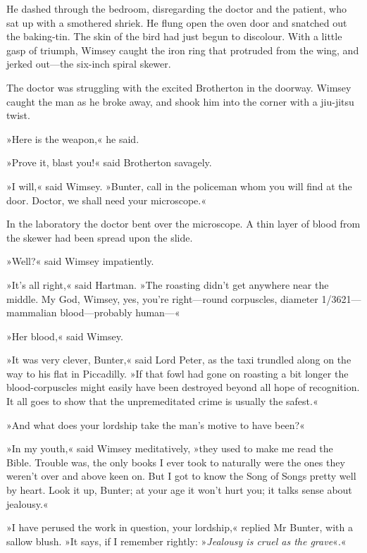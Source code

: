 He dashed through the bedroom, disregarding the doctor and the patient, who sat up with a smothered shriek. He flung open the oven door and snatched out the baking-tin. The skin of the bird had just begun to discolour. With a little gasp of triumph, Wimsey caught the iron ring that protruded from the wing, and jerked out—the six-inch spiral skewer.

The doctor was struggling with the excited Brotherton in the doorway. Wimsey caught the man as he broke away, and shook him into the corner with a jiu-jitsu twist.

»Here is the weapon,« he said.

»Prove it, blast you!« said Brotherton savagely.

»I will,« said Wimsey. »Bunter, call in the policeman whom you will find at the door. Doctor, we shall need your microscope.«

In the laboratory the doctor bent over the microscope. A thin layer of blood from the skewer had been spread upon the slide.

»Well?« said Wimsey impatiently.

»It's all right,« said Hartman. »The roasting didn't get anywhere near the middle. My God, Wimsey, yes, you're right—round corpuscles, diameter 1/3621—mammalian blood—probably human—«

»Her blood,« said Wimsey.

»It was very clever, Bunter,« said Lord Peter, as the taxi trundled along on the way to his flat in Piccadilly. »If that fowl had gone on roasting a bit longer the blood-corpuscles might easily have been destroyed beyond all hope of recognition. It all goes to show that the unpremeditated crime is usually the safest.«

»And what does your lordship take the man's motive to have been?«

»In my youth,« said Wimsey meditatively, »they used to make me read the Bible. Trouble was, the only books I ever took to naturally were the ones they weren't over and above keen on. But I got to know the Song of Songs pretty well by heart. Look it up, Bunter; at your age it won't hurt you; it talks sense about jealousy.«

»I have perused the work in question, your lordship,« replied Mr Bunter, with a sallow blush. »It says, if I remember rightly: »\textit{Jealousy is cruel as the grave}«.«